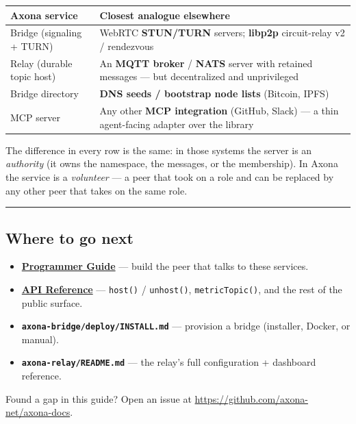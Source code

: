 \documentclass[
  nobib]{tufte-handout}
\newcounter{none} %
\providecommand{\tightlist}{%
  \setlength{\itemsep}{0pt}\setlength{\parskip}{0pt}}
\begin{document}
{\def\LTcaptype{none} %
\begin{longtable}[]{@{}
  >{\raggedright\arraybackslash}p{}
  >{\raggedright\arraybackslash}p{}@{}}
\toprule\noalign{}
\begin{minipage}[b]{\linewidth}\raggedright
Axona service
\end{minipage} & \begin{minipage}[b]{\linewidth}\raggedright
Closest analogue elsewhere
\end{minipage} \\
\midrule\noalign{}
\endhead
\bottomrule\noalign{}
\endlastfoot
Bridge (signaling + TURN) & WebRTC \textbf{STUN/TURN} servers;
\textbf{libp2p} circuit-relay v2 / rendezvous \\
Relay (durable topic host) & An \textbf{MQTT broker} / \textbf{NATS}
server with retained messages --- but decentralized and unprivileged \\
Bridge directory & \textbf{DNS seeds / bootstrap node lists} (Bitcoin,
IPFS) \\
MCP server & Any other \textbf{MCP integration} (GitHub, Slack) --- a
thin agent-facing adapter over the library \\
\end{longtable}
}

The difference in every row is the same: in those systems the server is
an \emph{authority} (it owns the namespace, the messages, or the
membership). In Axona the service is a \emph{volunteer} --- a peer that
took on a role and can be replaced by any other peer that takes on the
same role.

\begin{center}\rule{0.5\linewidth}{0.5pt}\end{center}

\subsection{Where to go next}\label{where-to-go-next}

\begin{itemize}
\tightlist
\item
  \textbf{\href{Axona-Programmer-Guide-v4.16.0.md}{Programmer Guide}}
  --- build the peer that talks to these services.
\item
  \textbf{\href{Axona-API-Reference-v4.16.0.md}{API Reference}} ---
  \texttt{host()} / \texttt{unhost()}, \texttt{metricTopic()}, and the
  rest of the public surface.
\item
  \textbf{\texttt{axona-bridge/deploy/INSTALL.md}} --- provision a
  bridge (installer, Docker, or manual).
\item
  \textbf{\texttt{axona-relay/README.md}} --- the relay's full
  configuration + dashboard reference.
\end{itemize}

Found a gap in this guide? Open an issue at
\url{https://github.com/axona-net/axona-docs}.
\end{document}
